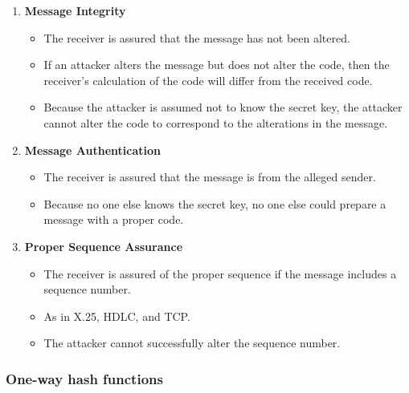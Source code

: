 \documentclass{article}
\begin{document}
                                    \begin{enumerate}
                                        \item \textbf{Message Integrity}
                                        \begin{itemize}
                                            \item The receiver is assured that the message has not been altered.
                                            \item If an attacker alters the message but does not alter the code, then the receiver’s calculation of the code will differ from the received code.
                                            \item Because the attacker is assumed not to know the secret key, the attacker cannot alter the code to correspond to the alterations in the message.
                                        \end{itemize}
                                        \item \textbf{Message Authentication}
                                        \begin{itemize}
                                            \item The receiver is assured that the message is from the alleged sender.
                                            \item Because no one else knows the secret key, no one else could prepare a message with a proper code.
                                        \end{itemize}
                                        \item \textbf{Proper Sequence Assurance}
                                        \begin{itemize}
                                            \item The receiver is assured of the proper sequence if the message includes a sequence number.
                                            \item As in X.25, HDLC, and TCP.
                                            \item The attacker cannot successfully alter the sequence number.
                                        \end{itemize}
                                    \end{enumerate}
                            \subsubsection{One-way hash functions}
\end{document}
